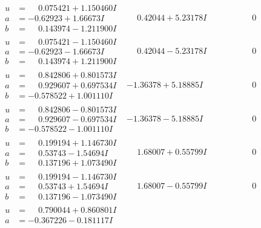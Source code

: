 \documentclass[1p]{elsarticle_modified}
\theoremstyle{definition}
\begin{document}
$$\begin{array}{c|c|c}
 \hline 
\begin{aligned}
u &= \phantom{-}0.075421 + 1.150460 I \\
a &= -0.62923 + 1.66673 I \\
b &= \phantom{-}0.143974 - 1.211900 I\end{aligned}
 & \phantom{-}0.42044 + 5.23178 I & \phantom{-0.000000 } 0 \\ \hline\begin{aligned}
u &= \phantom{-}0.075421 - 1.150460 I \\
a &= -0.62923 - 1.66673 I \\
b &= \phantom{-}0.143974 + 1.211900 I\end{aligned}
 & \phantom{-}0.42044 - 5.23178 I & \phantom{-0.000000 } 0 \\ \hline\begin{aligned}
u &= \phantom{-}0.842806 + 0.801573 I \\
a &= \phantom{-}0.929607 + 0.697534 I \\
b &= -0.578522 + 1.001110 I\end{aligned}
 & -1.36378 + 5.18885 I & \phantom{-0.000000 } 0 \\ \hline\begin{aligned}
u &= \phantom{-}0.842806 - 0.801573 I \\
a &= \phantom{-}0.929607 - 0.697534 I \\
b &= -0.578522 - 1.001110 I\end{aligned}
 & -1.36378 - 5.18885 I & \phantom{-0.000000 } 0 \\ \hline\begin{aligned}
u &= \phantom{-}0.199194 + 1.146730 I \\
a &= \phantom{-}0.53743 - 1.54694 I \\
b &= \phantom{-}0.137196 + 1.073490 I\end{aligned}
 & \phantom{-}1.68007 + 0.55799 I & \phantom{-0.000000 } 0 \\ \hline\begin{aligned}
u &= \phantom{-}0.199194 - 1.146730 I \\
a &= \phantom{-}0.53743 + 1.54694 I \\
b &= \phantom{-}0.137196 - 1.073490 I\end{aligned}
 & \phantom{-}1.68007 - 0.55799 I & \phantom{-0.000000 } 0 \\ \hline\begin{aligned}
u &= \phantom{-}0.790044 + 0.860801 I \\
a &= -0.367226 - 0.181117 I \\

\end{aligned}
\end{array}$$
\end{document}
